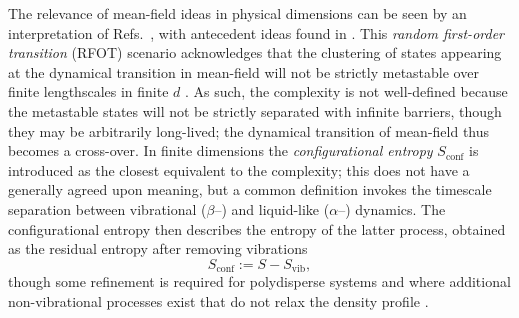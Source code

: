 \documentclass[11pt,twoside]{report}
\begin{document}
The relevance of mean-field ideas in physical dimensions can be seen by an interpretation of Refs.\ \cite{KirkpatrickPRB1987,HallJCP1987,KirkpatrickPRA1989}, with antecedent ideas found in \cite{KauzmannCR1948,AdamJCP1965}.
This \emph{random first-order transition} (RFOT) scenario acknowledges that the clustering of states appearing at the dynamical transition in mean-field will not be strictly metastable over finite lengthscales in finite $d$ \cite{BouchaudJCP2004,MontanariJSP2006}.
As such, the complexity is not well-defined because the metastable states will not be strictly separated with infinite barriers, though they may be arbitrarily long-lived; the dynamical transition of mean-field thus becomes a cross-over.
In finite dimensions the \emph{configurational entropy} $S_\mathrm{conf}$ is introduced as the closest equivalent to the complexity; this does not have a generally agreed upon meaning, but a common definition invokes the timescale separation between vibrational ($\beta$--) and liquid-like ($\alpha$--) dynamics.
The configurational entropy then describes the entropy of the latter process, obtained as the residual entropy after removing vibrations
\begin{equation}\label{eq:sconf}
  S_\mathrm{conf} := S - S_\mathrm{vib},
\end{equation}
though some refinement is required for polydisperse systems \cite{OzawaJCP2017,OzawaJCP2018} and where additional non-vibrational processes exist that do not relax the density profile \cite{OzawaPRL2018}.
\end{document}

